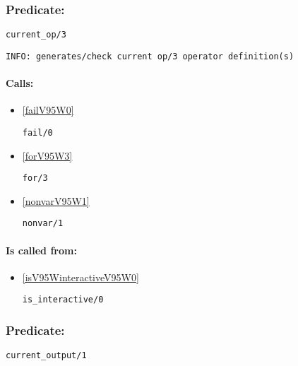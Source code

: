 \subsubsection{Predicate:} \label{currentV95WopV95W3}

\begin{verbatim}
current_op/3
\end{verbatim}

{\small \begin{verbatim}
INFO: generates/check current op/3 operator definition(s)

\end{verbatim}}
\paragraph{Calls:} 
\begin{itemize}
\item \ref{failV95W0} 
\begin{verbatim}
fail/0
\end{verbatim}

\item \ref{forV95W3} 
\begin{verbatim}
for/3
\end{verbatim}

\item \ref{nonvarV95W1} 
\begin{verbatim}
nonvar/1
\end{verbatim}

\end{itemize}
\paragraph{Is called from:} 
\begin{itemize}
\item \ref{isV95WinteractiveV95W0} 
\begin{verbatim}
is_interactive/0
\end{verbatim}

\end{itemize}

\subsubsection{Predicate:} \label{currentV95WoutputV95W1}

\begin{verbatim}
current_output/1
\end{verbatim}

